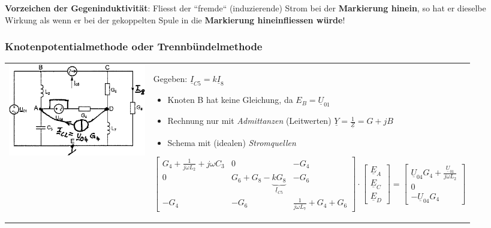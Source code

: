 \textbf{Vorzeichen der Gegeninduktivität}: 
Fliesst der ``fremde`` (induzierende) Strom bei der \textbf{Markierung hinein}, so hat er dieselbe
Wirkung als wenn er bei der gekoppelten Spule in die \textbf{Markierung
hineinfliessen würde}! 

\newpage
\subsubsection{Knotenpotentialmethode oder Trennbündelmethode}
\begin{tabular}{ll}
\parbox{6cm}{\includegraphics[width=6cm]{./bilder/netzwerkanalyse-knotenpotential.png}
	}
	& \parbox{12cm}{
	Gegeben: $\underline{I}_{C5} = k \underline{I}_8$
	\begin{itemize}
      \item Knoten B hat keine Gleichung, da $E_B = \underline{U}_{01}$
      \item Rechnung nur mit \textit{Admittanzen} (Leitwerten) $\underline{Y}
      = \frac{1}{\underline{Z}} = G + jB$
      \item Schema mit (idealen) \textit{Stromquellen}
    \end{itemize}
$$\begin{bmatrix}
    G_4 + \frac{1}{j \omega L_2} + j \omega C_3 & 0 & -G_4 \\
    0 & G_6 + G_8 - \underbrace{k G_8}_{\underline{I}_{C5}} & -G_6 \\
    -G_4 & -G_6 & \frac{1}{j \omega L_7} + G_4 + G_6   
	\end{bmatrix} \cdot
\begin{bmatrix}
    \underline{E}_A \\ \underline{E}_C \\ \underline{E}_D
    \end{bmatrix} =
\begin{bmatrix}
    \underline{U}_{04} G_4 + \frac{\underline{U}_{01} }{j \omega L_2}\\ 
    0 \\
    -\underline{U}_{04} G_4 \end{bmatrix}$$    
	}
\end{tabular}

